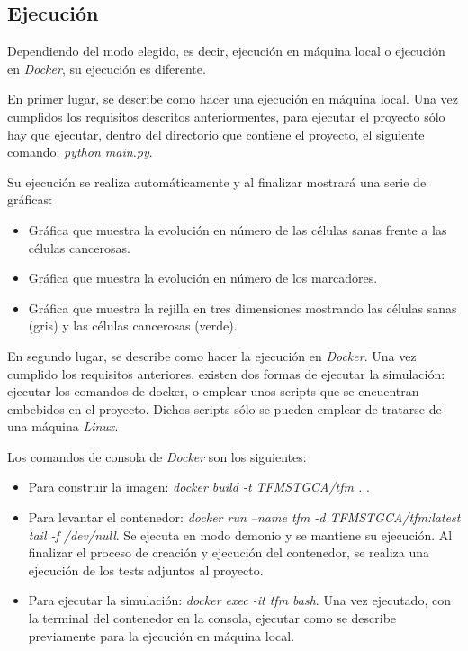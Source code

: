 \subsection{Ejecución}

Dependiendo del modo elegido, es decir, ejecución en máquina local o ejecución en \textit{Docker}, su ejecución es diferente.

En primer lugar, se describe como hacer una ejecución en máquina local. Una vez cumplidos los requisitos descritos anteriormentes,
para ejecutar el proyecto sólo hay que ejecutar, dentro del directorio que contiene el proyecto, el siguiente comando:
\textit{python main.py}.

Su ejecución se realiza automáticamente y al finalizar mostrará una serie de gráficas:

\begin{itemize}
  \item Gráfica que muestra la evolución en número de las células sanas frente a las células cancerosas.
  \item Gráfica que muestra la evolución en número de los marcadores.
  \item Gráfica que muestra la rejilla en tres dimensiones mostrando las células sanas (gris) y las células cancerosas (verde).
\end{itemize}

En segundo lugar, se describe como hacer la ejecución en \textit{Docker}. Una vez cumplido los requisitos anteriores, existen dos
formas de ejecutar la simulación: ejecutar los comandos de docker, o emplear unos scripts que se encuentran embebidos en el proyecto.
Dichos scripts sólo se pueden emplear de tratarse de una máquina \textit{Linux}.

\clearpage

Los comandos de consola de \textit{Docker} son los siguientes:

\begin{itemize}
  \item Para construir la imagen: \textit{docker build -t TFMSTGCA/tfm . }.
  \item Para levantar el contenedor: \textit{docker run --name tfm -d TFMSTGCA/tfm:latest tail -f /dev/null}. Se ejecuta en modo demonio y se mantiene su
  ejecución. Al finalizar el proceso de creación y ejecución del contenedor, se realiza una ejecución de los tests adjuntos al proyecto.
  \item Para ejecutar la simulación: \textit{docker exec -it tfm bash}. Una vez ejecutado, con la terminal del contenedor en la consola, ejecutar como se describe previamente
  para la ejecución en máquina local.
\end{itemize}

